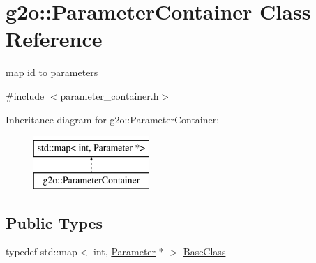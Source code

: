 \hypertarget{classg2o_1_1_parameter_container}{}\section{g2o\+:\+:Parameter\+Container Class Reference}
\label{classg2o_1_1_parameter_container}


map id to parameters  




{\ttfamily \#include $<$parameter\+\_\+container.\+h$>$}

Inheritance diagram for g2o\+:\+:Parameter\+Container\+:\begin{figure}[H]
\begin{center}
\leavevmode
\includegraphics[height=2.000000cm]{classg2o_1_1_parameter_container}
\end{center}
\end{figure}
\subsection*{Public Types}
\begin{DoxyCompactItemize}
\item 
typedef std\+::map$<$ int, \mbox{\hyperlink{classg2o_1_1_parameter}{Parameter}} $\ast$ $>$ \mbox{\hyperlink{classg2o_1_1_parameter_container_a200fdfdce01f7fb5f96e02a8ddf666ac}{Base\+Class}}
\end{DoxyCompactItemize}
